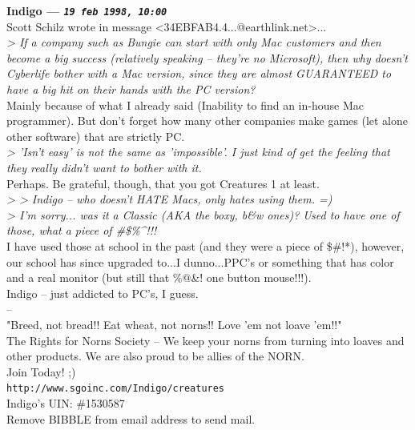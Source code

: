 \documentclass[11pt,twoside,a4paper]{article}
\begin{document}
\begin{multicols*}{2}
 
		
	
		
\textbf{Indigo --- \emph{\texttt{19 feb 1998, 10:00}}}~\\

Scott Schilz wrote in message <34EBFAB4.4...@earthlink.net>...~\\
\emph{> If a company such as Bungie can start with only Mac customers and then become a big success (relatively speaking -- they're no Microsoft), then why doesn't Cyberlife bother with a Mac version, since they are almost GUARANTEED to have a big hit on their hands with the PC version?}~\\

Mainly because of what I already said (Inability to find an in-house Mac programmer). But don't forget how many other companies make games (let alone other software) that are strictly PC.~\\

\emph{> 'Isn't easy' is not the same as 'impossible'. I just kind of get the feeling that they really didn't want to bother with it.}~\\

Perhaps. Be grateful, though, that you got Creatures 1 at least.~\\

\emph{> >  Indigo -- who doesn't HATE Macs, only hates using them. =)}~\\
\emph{> I'm sorry... was it a Classic (AKA the boxy, b\&w ones)? Used to have one of those, what a piece of \*\#\$\%\^\@!!!}~\\

I have used those at school in the past (and they were a piece of \$\#!*), however, our school has since upgraded to...I dunno...PPC's or something that has color and a real monitor (but still that \%@\&! one button mouse!!!).~\\

Indigo -- just addicted to PC's, I guess.~\\

-- ~\\
"Breed, not bread!! Eat wheat, not norns!! Love 'em not loave 'em!!"~\\
The Rights for Norns Society -- We keep your norns from turning into loaves and other products. We are also proud to be allies of the NORN.~\\
Join Today! ;)~\\
\texttt{http://www.sgoinc.com/Indigo/creatures}~\\
Indigo's UIN: \#1530587~\\
Remove BIBBLE from email address to send mail.~\\


\end{multicols*}
\end{document}
